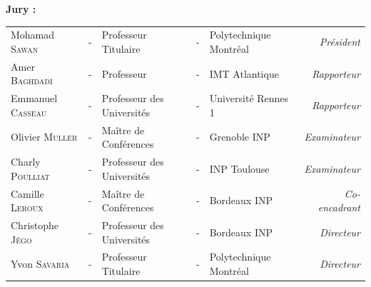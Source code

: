 \documentclass[a4paper, 11pt]{article}
\begin{document}
          \noindent \large \textbf{Jury :} \\
          \vspace*{-1.5em}
          \begin{center}
            \begin{tabular}{lclclr}
              Mohamad \textsc{Sawan}     & - & Professeur Titulaire       & - & Polytechnique Montréal & \textit{Président}    \\
              Amer \textsc{Baghdadi}     & - & Professeur                 & - & IMT Atlantique         & \textit{Rapporteur}   \\
              Emmanuel \textsc{Casseau}  & - & Professeur des Universités & - & Université Rennes 1    & \textit{Rapporteur}   \\
              Olivier \textsc{Muller}    & - & Maître de Conférences      & - & Grenoble INP           & \textit{Examinateur}    \\
              Charly \textsc{Poulliat}   & - & Professeur des Universités & - & INP Toulouse           & \textit{Examinateur}    \\
              Camille \textsc{Leroux}    & - & Maître de Conférences      & - & Bordeaux INP           & \textit{Co-encadrant} \\
              Christophe \textsc{Jégo}   & - & Professeur des Universités & - & Bordeaux INP           & \textit{Directeur}    \\
              Yvon \textsc{Savaria}      & - & Professeur Titulaire       & - & Polytechnique Montréal & \textit{Directeur}    \\
            \end{tabular}
          \end{center}
          
          
          
        
\end{document}
